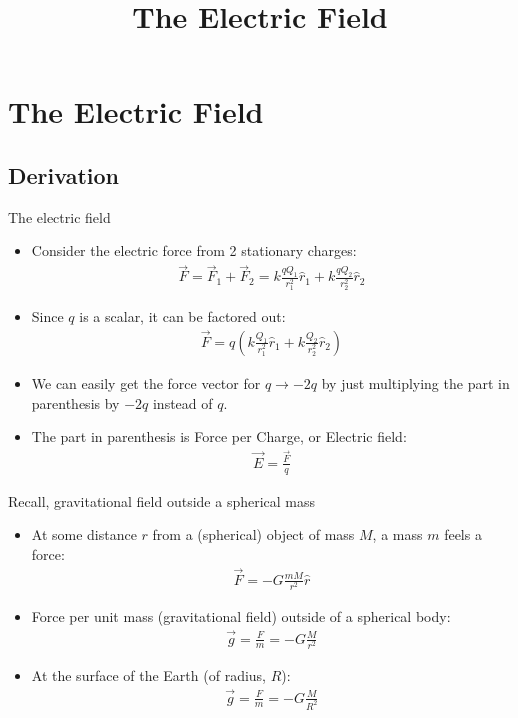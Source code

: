 \documentclass[aspectratio=169,
hyperref={colorlinks,urlcolor=blue}
]{beamer}
\begin{document}
\section{The Electric Field}
\label{sec:thelectricfield}
\title{The Electric Field}


\begin{frame}
\titlepage
\thispagestyle{empty}
\end{frame}





\subsection{Derivation}
\label{subsec:derivation}
\begin{frame}{The electric field}
\begin{itemize}
\item Consider the electric force from 2 stationary charges:
\begin{align*}
\vec F = \vec F_1 + \vec F_2=k\frac{qQ_1}{r_1^2}\hat r_1+k\frac{qQ_2}{r_2^2}\hat r_2
\end{align*}
\item Since $q$ is a scalar, it can be factored out:
\begin{align*}
\vec F =q\left( k\frac{Q_1}{r_1^2}\hat r_1+k\frac{Q_2}{r_2^2}\hat r_2\right)
\end{align*}
\item We can easily get the force vector for $q\to -2q$ by just multiplying the part in parenthesis by $-2q$ instead of $q$.
\item The part in parenthesis is Force per Charge, or Electric field:
\begin{align*}
\vec E = \frac{\vec F}{q}
\end{align*}
\end{itemize}

\end{frame}


\begin{frame}{Recall, gravitational field outside a spherical mass}
\begin{itemize}
\item At some distance $r$ from a (spherical) object of mass $M$, a mass $m$ feels a force:
\begin{align*}
\vec F = -G\frac{mM}{r^2}\hat r
\end{align*}
\item Force per unit mass (gravitational field) outside of a spherical body:
\begin{align*}
\vec g = \frac{F}{m}=-G\frac{M}{r^2}
\end{align*}
\item At the surface of the Earth (of radius, $R$):
\begin{align*}
\vec g = \frac{F}{m}=-G\frac{M}{R^2}
\end{align*}
\end{itemize}

\end{frame}
\end{document}
